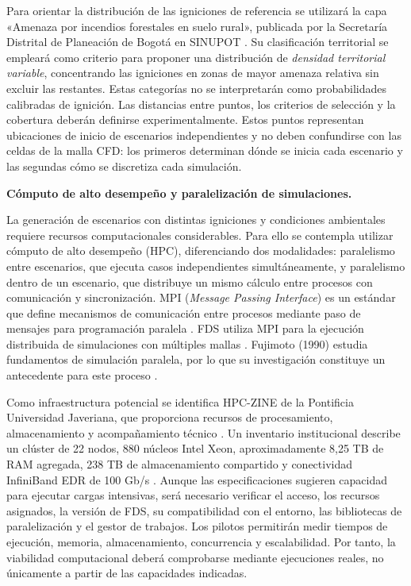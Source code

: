 Para orientar la distribución de las igniciones de referencia se utilizará la capa «Amenaza por incendios forestales en suelo rural», publicada por la Secretaría Distrital de Planeación de Bogotá en SINUPOT \cite{sdppotamenaza40}. Su clasificación territorial se empleará como criterio para proponer una distribución de \emph{densidad territorial variable}, concentrando las igniciones en zonas de mayor amenaza relativa sin excluir las restantes. Estas categorías no se interpretarán como probabilidades calibradas de ignición. Las distancias entre puntos, los criterios de selección y la cobertura deberán definirse experimentalmente. Estos puntos representan ubicaciones de inicio de escenarios independientes y no deben confundirse con las celdas de la malla CFD: los primeros determinan dónde se inicia cada escenario y las segundas cómo se discretiza cada simulación.

\textbf{Cómputo de alto desempeño y paralelización de simulaciones.}

La generación de escenarios con distintas igniciones y condiciones ambientales requiere recursos computacionales considerables. Para ello se contempla utilizar cómputo de alto desempeño (HPC), diferenciando dos modalidades: paralelismo entre escenarios, que ejecuta casos independientes simultáneamente, y paralelismo dentro de un escenario, que distribuye un mismo cálculo entre procesos con comunicación y sincronización. MPI (\emph{Message Passing Interface}) es un estándar que define mecanismos de comunicación entre procesos mediante paso de mensajes para programación paralela \cite{vfpMPI2025}. FDS utiliza MPI para la ejecución distribuida de simulaciones con múltiples mallas \cite{fdsnist}. Fujimoto (1990) estudia fundamentos de simulación paralela, por lo que su investigación constituye un antecedente para este proceso \cite{vfpFujimoto1990}.

Como infraestructura potencial se identifica HPC-ZINE de la Pontificia Universidad Javeriana, que proporciona recursos de procesamiento, almacenamiento y acompañamiento técnico \cite{vfpHPCZINE}. Un inventario institucional describe un clúster de 22 nodos, 880 núcleos Intel Xeon, aproximadamente 8,25 TB de RAM agregada, 238 TB de almacenamiento compartido y conectividad InfiniBand EDR de 100 Gb/s \cite{vfpHPCInventario}. Aunque las especificaciones sugieren capacidad para ejecutar cargas intensivas, será necesario verificar el acceso, los recursos asignados, la versión de FDS, su compatibilidad con el entorno, las bibliotecas de paralelización y el gestor de trabajos. Los pilotos permitirán medir tiempos de ejecución, memoria, almacenamiento, concurrencia y escalabilidad. Por tanto, la viabilidad computacional deberá comprobarse mediante ejecuciones reales, no únicamente a partir de las capacidades indicadas.

